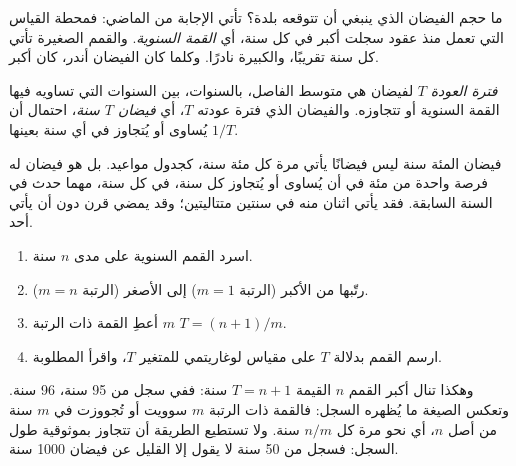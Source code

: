 ما حجم الفيضان الذي ينبغي أن تتوقعه بلدة؟ تأتي الإجابة من الماضي: فمحطة القياس التي
تعمل منذ عقود سجلت أكبر  في كل سنة، أي \emph{القمة السنوية}. والقمم الصغيرة تأتي
كل سنة تقريبًا، والكبيرة نادرًا. وكلما كان الفيضان أندر، كان
أكبر.

\begin{definition}\label{def:g10:drainage-basins:return-period}
\emph{فترة العودة} $T$ لفيضان هي متوسط الفاصل، بالسنوات، بين
السنوات التي تساويه فيها القمة السنوية أو تتجاوزه. والفيضان الذي فترة عودته $T$،
أي \emph{فيضان $T$ سنة}، احتمال أن يُساوى أو يُتجاوز في أي سنة بعينها
$1/T$.
\end{definition}

فيضان المئة سنة ليس فيضانًا يأتي مرة كل مئة سنة، كجدول مواعيد. بل هو فيضان له
فرصة واحدة من مئة في أن يُساوى أو يُتجاوز كل سنة، في كل سنة، مهما حدث في السنة
السابقة. فقد يأتي اثنان منه في سنتين متتاليتين؛ وقد يمضي قرن دون أن يأتي
أحد.

\begin{method}\label{met:g10:drainage-basins:return-periods}
\begin{enumerate}
  \item اسرد القمم السنوية على مدى $n$ سنة.
  \item رتّبها من الأكبر (الرتبة $m = 1$) إلى الأصغر
        (الرتبة $m = n$).
  \item أعطِ القمة ذات الرتبة $m$  $T = (n + 1)/m$.
  \item ارسم القمم بدلالة $T$ على مقياس لوغاريتمي للمتغير $T$، واقرأ
          المطلوبة.
\end{enumerate}
\end{method}

وهكذا تنال أكبر القمم $n$ القيمة $T = n + 1$ سنة: ففي سجل من
\num{95} سنة، \num{96} سنة. وتعكس الصيغة ما يُظهره السجل:
فالقمة ذات الرتبة $m$ سوويت أو تُجووزت في $m$ سنة من أصل $n$،
أي نحو مرة كل $n/m$ سنة. ولا تستطيع الطريقة أن تتجاوز بموثوقية طول
السجل: فسجل من \num{50} سنة لا يقول إلا القليل عن فيضان
\num{1000} سنة.


